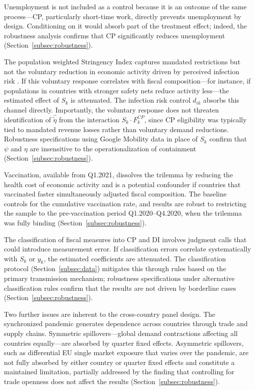 \documentclass[12pt, a4paper]{article}
\begin{document}
Unemployment is not included as a control because it is an outcome of the same process---CP, particularly short-time work, directly prevents unemployment by design. Conditioning on it would absorb part of the treatment effect; indeed, the robustness analysis confirms that CP significantly reduces unemployment (Section~\ref{subsec:robustness}).

The population weighted Stringency Index captures mandated restrictions but not the voluntary reduction in economic activity driven by perceived infection risk
\citep{chetty2020, GOOLSBEE2021}. If this voluntary response correlates with fiscal
composition---for instance, if populations in countries with stronger safety nets
reduce activity less---the estimated effect of $S_k$ is attenuated. The infection risk
control $d_{ik}$ absorbs this channel directly. Importantly, the voluntary response
does not threaten identification of $\hat{\tilde\eta}$ from the interaction $S_k \cdot F_k^{CP}$, since CP eligibility was typically tied to mandated revenue losses rather than voluntary demand reductions. Robustness specifications using Google Mobility data in place of $S_k$ confirm that $\psi$ and $\eta$ are insensitive to the operationalization of containment (Section~\ref{subsec:robustness}).

Vaccination, available from Q1.2021, dissolves the trilemma by reducing the health
cost of economic activity and is a potential confounder if countries that vaccinated
faster simultaneously adjusted fiscal composition. The baseline controls for the
cumulative vaccination rate, and results are robust to restricting the sample to the
pre-vaccination period Q1.2020--Q4.2020, when the trilemma was fully binding
(Section~\ref{subsec:robustness}).

The classification of fiscal measures into CP and DI involves judgment calls that
could introduce measurement error. If classification errors correlate systematically
with $S_k$ or $y_k$, the estimated coefficients are attenuated. The classification
protocol (Section~\ref{subsec:data}) mitigates this through rules based on the primary
transmission mechanism; robustness specifications under alternative classification
rules confirm that the results are not driven by borderline cases
(Section~\ref{subsec:robustness}).

Two further issues are inherent to the cross-country panel design. The synchronized
pandemic generates dependence across countries through trade and supply chains.
Symmetric spillovers---global demand contractions affecting all countries
equally---are absorbed by quarter fixed effects. Asymmetric spillovers, such as
differential EU single market exposure that varies over the pandemic, are not fully
absorbed by either country or quarter fixed effects and constitute a maintained
limitation, partially addressed by the finding that controlling for trade openness does not affect the results (Section~\ref{subsec:robustness}).
\end{document}
